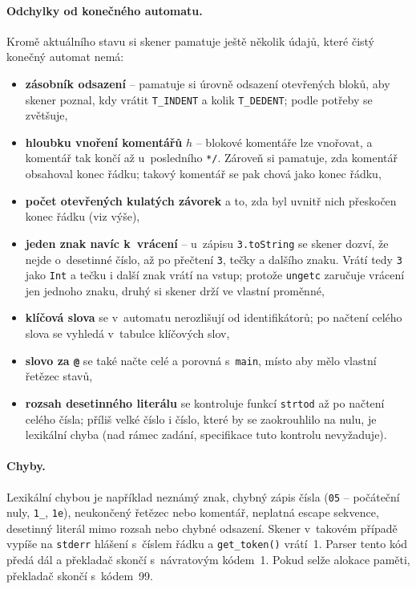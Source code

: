 \paragraph{Odchylky od konečného automatu.}
Kromě aktuálního stavu si skener pamatuje ještě několik údajů, které čistý
konečný automat nemá:
\begin{itemize}
  \item \textbf{zásobník odsazení} -- pamatuje si úrovně odsazení
        otevřených bloků, aby skener poznal, kdy vrátit \texttt{T\_INDENT}
        a kolik \texttt{T\_DEDENT}; podle potřeby se zvětšuje,
  \item \textbf{hloubku vnoření komentářů} $h$ -- blokové komentáře lze
        vnořovat, a komentář tak končí až u~posledního \texttt{*/}.
        Zároveň si pamatuje, zda komentář obsahoval konec řádku; takový
        komentář se pak chová jako konec řádku,
  \item \textbf{počet otevřených kulatých závorek} a to, zda byl uvnitř
        nich přeskočen konec řádku (viz výše),
  \item \textbf{jeden znak navíc k~vrácení} -- u~zápisu \texttt{3.toString}
        se skener dozví, že nejde o~desetinné číslo, až po přečtení
        \texttt{3}, tečky a dalšího znaku. Vrátí tedy \texttt{3} jako
        \texttt{Int} a tečku i další znak vrátí na vstup; protože
        \texttt{ungetc} zaručuje vrácení jen jednoho znaku, druhý si skener
        drží ve vlastní proměnné,
  \item \textbf{klíčová slova} se v~automatu nerozlišují od identifikátorů;
        po načtení celého slova se vyhledá v~tabulce klíčových slov,
  \item \textbf{slovo za \texttt{@}} se také načte celé a porovná
        s~\texttt{main}, místo aby mělo vlastní řetězec stavů,
    \item \textbf{rozsah desetinného literálu} se kontroluje funkcí
        \texttt{strtod} až po načtení celého čísla; příliš velké číslo
        i číslo, které by se zaokrouhlilo na nulu, je lexikální chyba
        (nad rámec zadání, specifikace tuto kontrolu nevyžaduje).
\end{itemize}

\paragraph{Chyby.}
Lexikální chybou je například neznámý znak, chybný zápis čísla
(\texttt{05} -- počáteční nuly, \texttt{1\_}, \texttt{1e}), neukončený
řetězec nebo komentář, neplatná escape sekvence, desetinný literál mimo
rozsah nebo chybné odsazení.
Skener v~takovém případě vypíše na \texttt{stderr} hlášení s~číslem řádku
a \texttt{get\_token()} vrátí~1. Parser tento kód předá dál a překladač
skončí s~návratovým kódem~1. Pokud selže alokace paměti, překladač skončí
s~kódem~99.